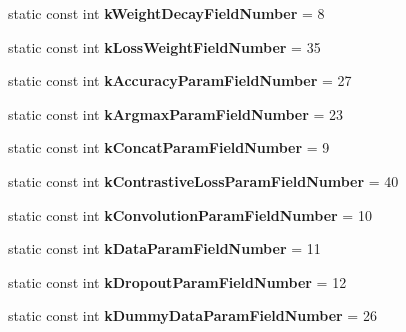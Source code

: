 \begin{DoxyCompactItemize}
static const int {\bfseries k\+Weight\+Decay\+Field\+Number} = 8
\item 
\mbox{\label{classcaffe_1_1_v1_layer_parameter_a1502aed6624e3a79b980b92793c48d07}} 
static const int {\bfseries k\+Loss\+Weight\+Field\+Number} = 35
\item 
\mbox{\label{classcaffe_1_1_v1_layer_parameter_a0c283334602d65140ad66b8aa1a5edd3}} 
static const int {\bfseries k\+Accuracy\+Param\+Field\+Number} = 27
\item 
\mbox{\label{classcaffe_1_1_v1_layer_parameter_abb6886c5e8fa14a3728d454a6383ebe5}} 
static const int {\bfseries k\+Argmax\+Param\+Field\+Number} = 23
\item 
\mbox{\label{classcaffe_1_1_v1_layer_parameter_a58457cbfdeac4ad53db9435b5d137981}} 
static const int {\bfseries k\+Concat\+Param\+Field\+Number} = 9
\item 
\mbox{\label{classcaffe_1_1_v1_layer_parameter_a57e80dc9ad7dd1491bb069b0bba9bbc5}} 
static const int {\bfseries k\+Contrastive\+Loss\+Param\+Field\+Number} = 40
\item 
\mbox{\label{classcaffe_1_1_v1_layer_parameter_a5d0a066693bd9ae1e961859ec90c1d6d}} 
static const int {\bfseries k\+Convolution\+Param\+Field\+Number} = 10
\item 
\mbox{\label{classcaffe_1_1_v1_layer_parameter_a3dc57ff91abec6f6a3471c400d1c232f}} 
static const int {\bfseries k\+Data\+Param\+Field\+Number} = 11
\item 
\mbox{\label{classcaffe_1_1_v1_layer_parameter_a233ef82b59ce0717155ff5b37de6a9c2}} 
static const int {\bfseries k\+Dropout\+Param\+Field\+Number} = 12
\item 
\mbox{\label{classcaffe_1_1_v1_layer_parameter_a9cd580bdfdbaf371b2aabe991b5c3455}} 
static const int {\bfseries k\+Dummy\+Data\+Param\+Field\+Number} = 26
\item 

\end{DoxyCompactItemize}
